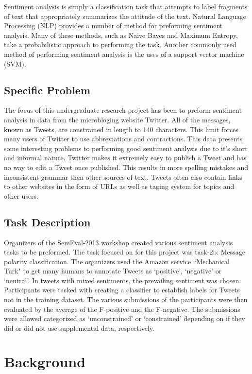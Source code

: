 \documentclass[12pt]{article}
\begin{document}
Sentiment analysis is simply a classification task that attempts to label
fragments of text that appropriately summarizes the attitude of the text.
Natural Language Processing (NLP) provides a number of method for preforming
sentiment analysis. Many of these methods, such as Naive Bayes and Maximum
Entropy, take a probabilistic approach to performing the task. Another commonly
used method of performing sentiment analysis is the uses of a support vector
machine (SVM).


\subsection{Specific Problem}

The focus of this undergraduate research project has been to preform sentiment
analysis in data from the microbloging website Twitter. All of the messages,
known as Tweets, are constrained in length to 140 characters. This limit forces
many users of Twitter to use abbreviations and contractions. This data presents
some interesting problems to performing good sentiment analysis due to it's
short and informal nature. Twitter makes it extremely easy to publish a Tweet
and has no way to edit a Tweet once published. This results in more spelling
mistakes and inconsistent grammar then other sources of text. Tweets often also
contain links to other websites in the form of URLs as well as taging system
for topics and other users.

\subsection{Task Description}

Organizers of the SemEval-2013 workshop created various sentiment analysis
tasks to be preformed. The task focused on for this project was task-2b:
Message polarity classification. The organizers used the Amazon service
``Mechanical Turk" to get many humans to annotate Tweets as `positive',
`negative' or `neutral'. In tweets with mixed sentiments, the prevailing
sentiment was chosen. Participants were tasked with creating a classifier to
establish labels for Tweets not in the training dataset. The various
submissions of the participants were then evaluated by the average of the
F-positive and the F-negative. The submissions were allowed categorized as
`unconstrained' or `constrained' depending on if they did or did not use
supplemental data, respectively.

\section{Background}
\end{document}
